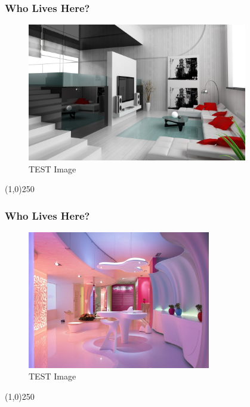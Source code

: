 \begin{frame}
\frametitle{Who Lives Here?}
\begin{figure}
	\centering
		\includegraphics[height=6cm]{img/A.jpg}
	\caption{TEST Image}
	\label{fig:lightingtypes}
\end{figure}
\end{frame}
\begin{center}\line(1,0){250}\end{center}



\begin{frame}
\frametitle{Who Lives Here?}
\begin{figure}
	\centering
		\includegraphics[height=6cm]{img/A1.jpg}
	\caption{TEST Image}
	\label{fig:lightingtypes}
\end{figure}
\end{frame}
\begin{center}\line(1,0){250}\end{center}



